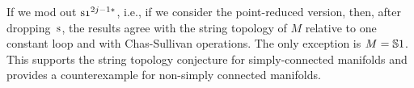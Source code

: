 \documentclass[\MainFolder/Text.tex]{subfiles}
\begin{document}
If we mod out $\Susp \NOne^{2j-1*}$, i.e., if we consider the point-reduced version, then, after dropping~$\mathrm{s}$, the results agree with the string topology of $M$ relative to one constant loop and with Chas-Sullivan operations. The only exception is $M=\mathbb{S}{1}$. This supports the string topology conjecture for simply-connected manifolds and provides a counterexample for non-simply connected manifolds.



%
%

%
%
%
\end{document}
